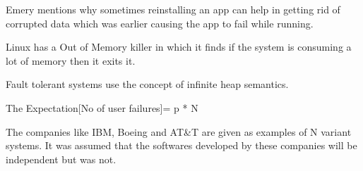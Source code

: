 \documentclass[twoside]{article}
\begin{document}
Emery mentions why sometimes reinstalling an app can help in getting rid of corrupted data which was earlier causing the app to fail while running.

Linux has a Out of Memory killer in which it finds if the system is consuming a lot of memory then it exits it.

Fault tolerant systems use the concept of infinite heap semantics.

The Expectation[No of user failures]= p * N

The companies like IBM, Boeing and AT&T are given as examples of N variant systems. It was assumed that the softwares developed by these companies will be independent but was not. 
\end{document}
